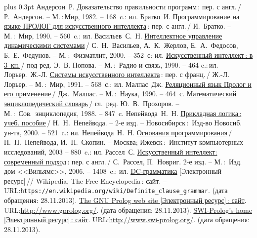 \documentclass[14pt, openany, twoside, draft]{extbook} %
\def\emphbib#1{#1}
\begin{document}
\begin{thebibliography}{99}\itemsep1pt \parskip 0pt plus 0.3pt
 Андерсон~Р. \emphbib{Доказательство правильности программ}\,{}: пер. с англ.\,{}/ Р.~Андерсон. -- М.\,:\,Мир, 1982. -- 168~c.: ил.
 Братко~И. \emphbib{\href{http://royallib.ru/book/bratko_ivan/programmirovanie_na_yazike_prolog_dlya_iskusstvennogo_intellekta.html}{Программирование на языке ПРОЛОГ для искусственного интеллекта}}\,{}: пер. с англ.\,/ И.~Братко. -- М.\,:~Мир, 1990. -- 560~c.: ил.
 Васильев~С.~Н. \emphbib{\href{http://bookfi.org/book/616050}{Интеллектное управление динамическими системами}}\,{}/ С.~Н.~Васильев, А.~К.~Жерлов, Е.~А.~Федосов, Б.~Е.~Федунов. -- М.\,:~Физматлит, 2000. -- 352~с: ил.
 \emphbib{\href{http://aihandbook.intsys.org.ru/index.php/intro/ai-handbook}{Искусственный интеллект\,{}: в 3~кн.}}\,{}/ под ред. Э.~В. Попова. -- М.\,:~Радио и связь, 1990. -- 464 c.:\,{}ил.
 Лорьер.~Ж.-Л.  \emphbib{\href{http://publ.lib.ru/ARCHIVES/L/LOR'ER_Jan_Lui/_Lor'er_J.L..html}{Системы искусственного интеллекта}\,{}: пер. с франц.}\,{}/ Ж.-Л. Лорьер. -- М.\,:~Мир, 1991. -- 568~с.: ил.
 Малпас~Дж. \emphbib{\href{http://padaread.com/?book=40731&pg=1}{Реляционный язык Пролог и его применение}}\,{}/ Дж.~Малпас. -- М.\,:~Наука, 1990. -- 464~с.
 \emphbib{\href{https://app.box.com/shared/793ukgvblxmj0hh6btw4}{Математический энциклопедический словарь}}\,{}/ гл.~ред. Ю.~В.~Прохоров. -- М.\,:~Сов.~энциклопедия, 1988. -- 847~c.
 Непейвода~Н.~Н. \emphbib{\href{http://www.logic-books.info/taxonomy/term/215}{Прикладная логика\,{}: учеб. пособие}}\,{}/ Н.~Н.~Непейвода. -- 2-е изд. -- Новосибирск\,{}:~Изд-во Новосиб. ун-та, 2000. -- 521~c.: ил.
 Непейвода~Н.~Н.  \emphbib{\href{http://philosophy.ru/library/logic_math/library/nepeivoda_prog.pdf}{Основания программирования}}\,{}/ Н.~Н.~Непейвода, И.~Н.~Скопин. -- Москва; Ижевск\,{}:~Институт компьютерных исследований, 2003 -- 880~c.: ил.
 Рассел~С. \href{http://www.aiportal.ru/downloads/books/ai-modern-approach-2-edition-by-rassel-norvig.html}{Искусственный интеллект: современный подход}\,{}: пер. с англ.\,{}/ С.~Рассел, П.~Новриг. 2-е изд. -- М.\,:~Изд. дом <<Вильямс>>, 2006. -- 1408~c.: ил.
 \emphbib{\href{https://en.wikipedia.org/wiki/Definite_clause_grammar}{DC-грамматика}} [Электронный ресурс]\,{}// Wikipedia, The Free Encyclopedia\,{}: сайт. -- URL:\texttt{https://en.wikipedia.org/wiki/Definite\_clause\linebreak\_grammar}. (дата обращения: 28.11.2013).
 \emphbib{\href{http://www.gprolog.org/}{The GNU Prolog web site [Электронный ресурс]\,{}: сайт}}. URL:\url{http://www.gprolog.org/}. (дата обращения: 28.11.2013).
 \emphbib{\href{http://www.swi-prolog.org/}{SWI-Prolog's home [Электронный ресурс]\,{}: сайт}}. URL:\url{http://www.swi-prolog.org/}. (дата обращения: 28.11.2013).
\end{thebibliography}
\label{lastpage}
\newpage
\thispagestyle{empty}
\mbox{}
\end{document}
